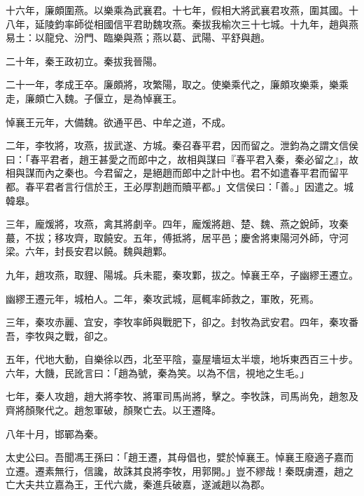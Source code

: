 \begin{pinyinscope}
十六年，廉頗圍燕。以樂乘為武襄君。十七年，假相大將武襄君攻燕，圍其國。十八年，延陵鈞率師從相國信平君助魏攻燕。秦拔我榆次三十七城。十九年，趙與燕易土：以龍兌、汾門、臨樂與燕；燕以葛、武陽、平舒與趙。

二十年，秦王政初立。秦拔我晉陽。

二十一年，孝成王卒。廉頗將，攻繁陽，取之。使樂乘代之，廉頗攻樂乘，樂乘走，廉頗亡入魏。子偃立，是為悼襄王。

悼襄王元年，大備魏。欲通平邑、中牟之道，不成。

二年，李牧將，攻燕，拔武遂、方城。秦召春平君，因而留之。泄鈞為之謂文信侯曰：「春平君者，趙王甚愛之而郎中之，故相與謀曰『春平君入秦，秦必留之』，故相與謀而內之秦也。今君留之，是絕趙而郎中之計中也。君不如遣春平君而留平都。春平君者言行信於王，王必厚割趙而贖平都。」文信侯曰：「善。」因遣之。城韓皋。

三年，龐煖將，攻燕，禽其將劇辛。四年，龐煖將趙、楚、魏、燕之銳師，攻秦蕞，不拔；移攻齊，取饒安。五年，傅抵將，居平邑；慶舍將東陽河外師，守河梁。六年，封長安君以饒。魏與趙鄴。

九年，趙攻燕，取貍、陽城。兵未罷，秦攻鄴，拔之。悼襄王卒，子幽繆王遷立。

幽繆王遷元年，城柏人。二年，秦攻武城，扈輒率師救之，軍敗，死焉。

三年，秦攻赤麗、宜安，李牧率師與戰肥下，卻之。封牧為武安君。四年，秦攻番吾，李牧與之戰，卻之。

五年，代地大動，自樂徐以西，北至平陰，臺屋墻垣太半壞，地坼東西百三十步。六年，大饑，民訛言曰：「趙為號，秦為笑。以為不信，視地之生毛。」

七年，秦人攻趙，趙大將李牧、將軍司馬尚將，擊之。李牧誅，司馬尚免，趙怱及齊將顏聚代之。趙怱軍破，顏聚亡去。以王遷降。

八年十月，邯鄲為秦。

太史公曰。吾聞馮王孫曰：「趙王遷，其母倡也，嬖於悼襄王。悼襄王廢適子嘉而立遷。遷素無行，信讒，故誅其良將李牧，用郭開。」豈不繆哉！秦既虜遷，趙之亡大夫共立嘉為王，王代六歲，秦進兵破嘉，遂滅趙以為郡。


\end{pinyinscope}